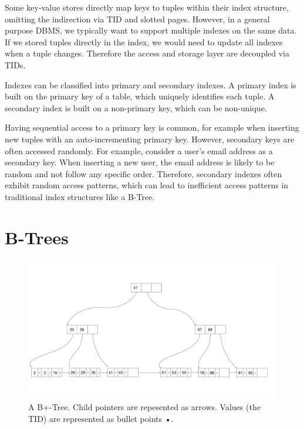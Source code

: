 Some key-value stores directly map keys to tuples within their index structure, omitting the indirection via \ac{TID} and slotted pages.
However, in a general purpose \ac{DBMS}, we typically want to support multiple indexes on the same data.
If we stored tuples directly in the index, we would need to update all indexes when a tuple changes.
Therefore the access and storage layer are decoupled via \ac{TID}s.

Indexes can be classified into primary and secondary indexes.
A primary index is built on the primary key of a table, which uniquely identifies each tuple.
A secondary index is built on a non-primary key, which can be non-unique.

Having sequential access to a primary key is common, for example when inserting new tuples with an auto-incrementing primary key.
However, secondary keys are often accessed randomly. For example, consider a user's email address as a secondary key.
When inserting a new user, the email address is likely to be random and not follow any specific order.
Therefore, secondary indexes often exhibit random access patterns, which can lead to inefficient access patterns in traditional index structures like a B-Tree.


\section{B-Trees}

\begin{figure}[htpb]
  \centering
  \includegraphics[width=0.99\textwidth]{figures/b_tree.pdf}
  \caption{A B+-Tree. Child pointers are repesented as arrows. Values (the \ac{TID}) are represented as bullet points •.}
  \label{fig:b-tree}
\end{figure}

